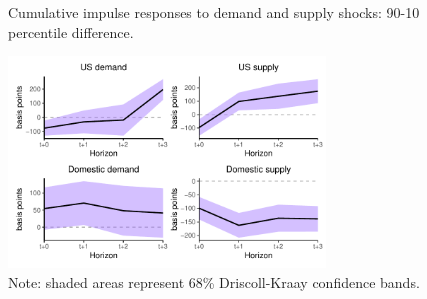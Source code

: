 \documentclass[12pt, a4paper]{article}
\begin{document}
\begin{figure}[H]
    \centering
    \caption{Cumulative impulse responses to demand and supply shocks: 90-10 percentile difference.}
    \label{fig:9010_demand_supply}
    \includegraphics[width=0.75\textwidth]{Figures/p9010_demand_supply_LP.pdf}
    \centering \caption*{Note: shaded areas represent 68\% Driscoll-Kraay confidence bands.}
\end{figure}
\newpage
\end{document}
